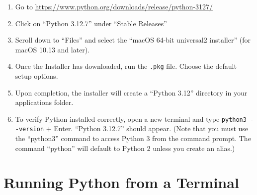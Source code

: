 \documentclass{UNB-Physics-Assignment}
\begin{document}
\begin{enumerate}
  \item Go to \href{https://www.python.org/downloads/release/python-3127/}{https://www.python.org/downloads/release/python-3127/}
  \item Click on ``Python 3.12.7'' under ``Stable Releases''
  \item Scroll down to ``Files'' and select the ``macOS 64-bit universal2 installer'' (for macOS 10.13 and later).
  \item Once the Installer has downloaded, run the \verb".pkg" file. Choose the default setup options.
  \item Upon completion, the installer will create a ``Python 3.12'' directory in your applications folder.
  \item To verify Python installed correctly, open a new terminal and type \verb"python3 --version" + Enter. ``Python 3.12.7'' should appear.
  (Note that you must use the ``python3'' command to access Python 3 from the command prompt. The command ``python'' will default to Python 2 unless you create an alias.)
\end{enumerate}

%
%

\section*{Running Python from a Terminal}
\end{document}
